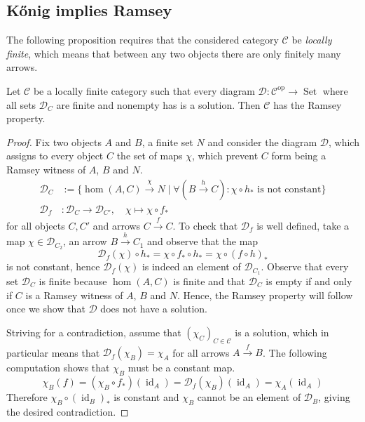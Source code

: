\documentclass[preprint,12pt]{elsarticle}
\newcommand{\cat}[1]{\mathcal{#1}}
\newcommand{\op}{^{\mathop{op}}}
\DeclareMathOperator{\Set}{Set}
\DeclareMathOperator{\id}{id}
\begin{document}
\subsection{K\H{o}nig implies Ramsey}
The following proposition requires that the considered category $\cat C$ be \emph{locally finite}, which means that between any two objects there are only finitely many arrows.



\begin{prop}
    Let $\cat C$ be a locally finite category such that every diagram $\cat D:\cat C\op\to\Set$ where all sets $\cat D_C$ are finite and nonempty has is a solution. Then $\cat C$ has the Ramsey property.
\end{prop}


\begin{proof}
Fix two objects $A$ and $B$, a finite set $N$ and consider the diagram $\cat D$, which assigns to every object $C$ the set of maps $\chi$, which prevent $C$ form being a Ramsey witness of $A$, $B$ and $N$.
\begin{align*}
    \cat D_C &:= \{\hom(A,C)\xrightarrow{\chi} N\mid \forall (B\xrightarrow{h} C): \chi\circ h_* \text{ is not constant}\} \\
    \cat D_f &: \cat D_{C}\to \cat D_{C'}, \quad \chi\mapsto \chi\circ f_*
\end{align*}
for all objects $C, C'$ and arrows $C\xrightarrow{f}C$. To check that $\cat D_f$ is well defined, take a map $\chi\in\cat D_{C_2}$, an arrow $B\xrightarrow{h}C_1$ and observe that the map
$$
\cat D_f(\chi) \circ h_* = \chi\circ f_*\circ h_* = \chi\circ(f\circ h)_* 
$$
is not constant, hence $\cat D_f(\chi)$ is indeed an element of $\cat D_{C_1}$.
Observe that every set $\cat D_C$ is finite because $\hom(A,C)$ is finite and that $\cat D_C$ is empty if and only if $C$ is a Ramsey witness of $A$, $B$ and $N$. Hence, the Ramsey property will follow once we show that $\cat D$ does not have a solution.

Striving for a contradiction, assume that $(\chi_C)_{C\in\cat C}$ is a solution, which in particular means that $\cat D_f(\chi_B) = \chi_{A}$ for all arrows $A\xrightarrow{f}B$. The following computation shows that $\chi_B$ must be a constant map.
$$
\chi_B(f) = 
(\chi_B\circ f_*)(\id_{A}) = 
\cat D_f(\chi_B)(\id_{A}) =
\chi_{A}(\id_{A})
$$
Therefore $\chi_B\circ (\id_B)_*$ is constant and $\chi_B$ cannot be an element of $\cat D_B$, giving the desired contradiction. 
\end{proof}
\end{document}
